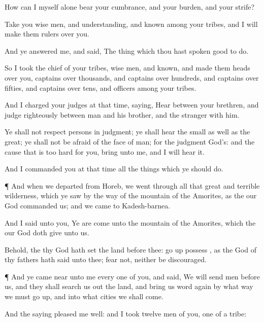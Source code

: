 {How can I myself alone
bear your
cumbrance, and your
burden, and your
strife?

Take you
wise
men, and
understanding, and
known among your
tribes, and I will
make them
rulers over you.

And ye
answered me, and
said, The
thing which thou hast
spoken
{}
good
{} to
do.

So I
took the
chief of your
tribes,
wise
men, and
known, and
made them
heads over you,
captains over
thousands, and
captains over
hundreds, and
captains over
fifties, and
captains over
tens, and
officers among your
tribes.

And I
charged your
judges at that
time,
saying,
Hear
{} between your
brethren, and
judge
righteously between
{}
man and his
brother, and the
stranger
{} with him.

Ye shall not
respect
persons in
judgment;
{} ye shall
hear the
small as well as the
great; ye shall not be
afraid of the
face of
man; for the
judgment
{}
God’s: and the
cause that is too
hard for you,
bring
{} unto me, and I will
hear it.

And I
commanded you at that
time all the
things which ye should
do.


\par }{\PP {}¶ And when we
departed from
Horeb, we went
through all that
great and
terrible
wilderness, which ye
saw by the
way of the
mountain of the
Amorites, as the
{} our
God
commanded us; and we
came to
Kadesh-barnea.

And I
said unto you, Ye are
come unto the
mountain of the
Amorites, which the
{} our
God doth
give unto us.

Behold, the
{} thy
God hath
set the
land
before thee: go
up
{}
possess
{}, as the
{}
God of thy
fathers hath
said unto thee;
fear not, neither be
discouraged.


\par }{\PP {}¶ And ye came
near unto me every one of you, and
said, We will
send
men
before us, and they shall search us
out the
land, and
bring us
word
again by what
way we must go
up, and into what
cities we shall
come.

And the
saying pleased me
well: and I
took
twelve
men of you,
one of a
tribe:

}

